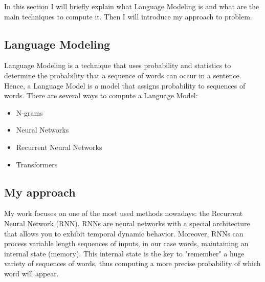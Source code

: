 In this section I will briefly explain what Language Modeling is and what are the main techniques to compute it. Then I will introduce my approach to problem.

\subsection{Language Modeling}
Language Modeling is a technique that uses probability and statistics to determine the probability that a sequence of words can occur in a sentence. Hence, a Language Model is a model that assigns probability to sequences of words. There are several ways to compute a Language Model:
\begin{itemize}
    \item N-grams \cite{Ngram_Language_Models}
    \item Neural Networks \cite{Bengio_et_al_2003}
    \item Recurrent Neural Networks \cite{ELMAN1990179}
    \item Transformers \cite{wang2019language}
\end{itemize}

\subsection{My approach}
My work focuses on one of the most used methods nowadays: the Recurrent Neural Network (RNN). RNNs are neural networks with a special architecture that allows you to exhibit temporal dynamic behavior. Moreover, RNNs can process variable length sequences of inputs, in our case words, maintaining an internal state (memory). This internal state is the key to "remember" a huge variety of sequences of words, thus computing a more precise probability of which word will appear.
